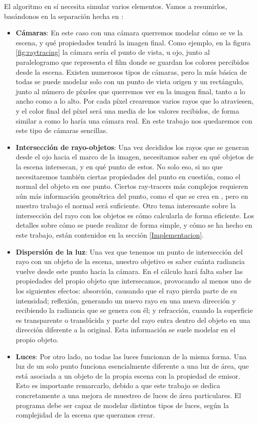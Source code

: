 \documentclass{scrbook}
\begin{document}
El algoritmo en sí necesita simular varios elementos. Vamos a resumirlos, basándonos en la separación hecha en \cite[Chapter~1]{pbrt}:
\begin{itemize}
	\item \textbf{Cámaras}: En este caso con una cámara querremos modelar cómo se ve la escena, y qué propiedades tendrá la imagen final. Como ejemplo, en la figura \ref{fig:raytracing} la cámara sería el punto de vista, u ojo, junto al paralelogramo que representa el film donde se guardan los colores percibidos desde la escena. Existen numerosos tipos de cámaras, pero la más básica de todas se puede modelar solo con un punto de vista origen y un rectángulo, junto al número de píxeles que querremos ver en la imagen final, tanto a lo ancho como a lo alto. Por cada píxel crearemos varios rayos que lo atraviesen, y el color final del píxel será una media de los valores recibidos, de forma similar a como lo haría una cámara real. En este trabajo nos quedaremos con este tipo de cámaras sencillas.
	\item \textbf{Intersección de rayo-objetos}: Una vez decididos los rayos que se generan desde el ojo hacia el marco de la imagen, necesitamos saber en qué objetos de la escena intersecan, y en qué punto de estos. No solo eso, si no que necesitaremos también ciertas propiedades del punto en cuestión, como el normal del objeto en ese punto. Ciertos ray-tracers más complejos requieren aún más información geométrica del punto, como el que se crea en \cite{pbrt}, pero en nuestro trabajo el normal será suficiente. Otro tema interesante sobre la intersección del rayo con los objetos es cómo calcularla de forma eficiente. Los detalles sobre cómo se puede realizar de forma simple, y cómo se ha hecho en este trabajo, están contenidos en la sección \ref{Implementacion}.
	\item \textbf{Dispersión de la luz}: Una vez que tenemos un punto de intersección del rayo con un objeto de la escena, nuestro objetivo es saber cuánta radiancia vuelve desde este punto hacia la cámara. En el cálculo hará falta saber las propiedades del propio objeto que intersecamos, provocando al menos uno de los siguientes efectos: absorción, causando que el rayo pierda parte de su intensidad; reflexión, generando un nuevo rayo en una nueva dirección y recibiendo la radiancia que se genera con él; y refracción, cuando la superficie es transparente o translúcida y parte del rayo entra dentro del objeto en una dirección diferente a la original. Esta información se suele modelar en el propio objeto.
	\item \textbf{Luces}: Por otro lado, no todas las luces funcionan de la misma forma. Una luz de un solo punto funciona esencialmente diferente a una luz de área, que está asociada a un objeto de la propia escena con la propiedad de emisor. Esto es importante remarcarlo, debido a que este trabajo se dedica concretamente a una mejora de muestreo de luces de área particulares. El programa debe ser capaz de modelar distintos tipos de luces, según la complejidad de la escena que queramos crear.

\end{itemize}
\end{document}
